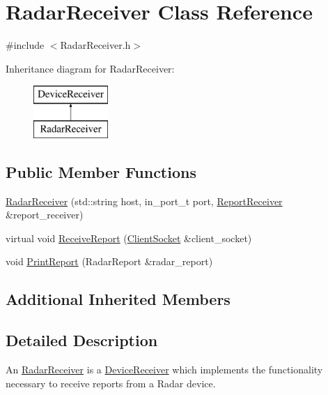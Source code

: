 \hypertarget{class_radar_receiver}{}\section{Radar\+Receiver Class Reference}
\label{class_radar_receiver}


{\ttfamily \#include $<$Radar\+Receiver.\+h$>$}

Inheritance diagram for Radar\+Receiver\+:\begin{figure}[H]
\begin{center}
\leavevmode
\includegraphics[height=2.000000cm]{class_radar_receiver}
\end{center}
\end{figure}
\subsection*{Public Member Functions}
\begin{DoxyCompactItemize}
\item 
\hyperlink{class_radar_receiver_a00371b4166c91a67e60e87ae723989d8}{Radar\+Receiver} (std\+::string host, in\+\_\+port\+\_\+t port, \hyperlink{class_report_receiver}{Report\+Receiver} \&report\+\_\+receiver)
\item 
virtual void \hyperlink{class_radar_receiver_acc3201ca9d9cabaca6a1d1e1e4d6d8bc}{Receive\+Report} (\hyperlink{class_client_socket}{Client\+Socket} \&client\+\_\+socket)
\item 
void \hyperlink{class_radar_receiver_a056db48d28f7b8b34d84aef6e4f63e49}{Print\+Report} (Radar\+Report \&radar\+\_\+report)
\end{DoxyCompactItemize}
\subsection*{Additional Inherited Members}


\subsection{Detailed Description}
An \hyperlink{class_radar_receiver}{Radar\+Receiver} is a \hyperlink{class_device_receiver}{Device\+Receiver} which implements the functionality necessary to receive reports from a Radar device. 

